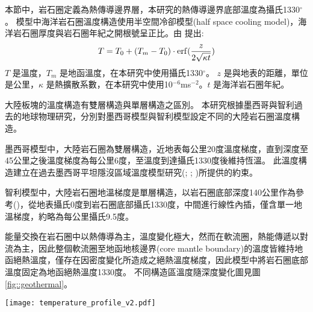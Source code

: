 

本節中，岩石圈定義為熱傳導邊界層，本研究的熱傳導邊界底部溫度為攝氏1330$^{\circ}$。
模型中海洋岩石圈溫度構造使用半空間冷卻模型(half space cooling model)，海洋岩石圈厚度與岩石圈年紀之開根號呈正比。由 \citet{davis1974}提出:
\begin{align}
T=T_0+(T_m-T_0)\cdot {\rm erf}(\frac{z}{2\sqrt{\kappa t}}) \label{eq:Half Space Model}
\end{align}
$T$ 是溫度，$T_m$ 是地函溫度，在本研究中使用攝氏1330$^{\circ}$。
$z$ 是與地表的距離，單位是公里，$\kappa$ 是熱擴散系數，在本研究中使用10$^{-6}$ms$^{-2}$。$t$ 是海洋岩石圈年紀。

大陸板塊的溫度構造有雙層構造與單層構造之區別。
本研究根據墨西哥與智利過去的地球物理研究，分別對墨西哥模型與智利模型設定不同的大陸岩石圈溫度構造。

墨西哥模型中，大陸岩石圈為雙層構造，近地表每公里20度溫度梯度，直到深度至45公里之後溫度梯度為每公里6度，至溫度到達攝氏1330度後維持恆溫。
此溫度構造建立在過去墨西哥平坦隱沒區域溫度模型研究(\citealp{Manea2005}; \citealp{Manea2011Thermal}; \citealp{Manea2011Curie})所提供的約束。

智利模型中，大陸岩石圈地溫梯度是單層構造，以岩石圈底部深度140公里作為參考(\citealp{perez2008})，從地表攝氏0度到岩石圈底部攝氏1330度，中間進行線性內插，僅含單一地溫梯度，約略為每公里攝氏9.5度。

能量交換在岩石圈中以熱傳導為主，溫度變化極大，然而在軟流圈，熱能傳遞以對流為主，因此整個軟流圈至地函地核邊界(core mantle boundary)的溫度皆維持地函絕熱溫度，僅存在因密度變化所造成之絕熱溫度梯度，因此模型中將岩石圈底部溫度固定為地函絕熱溫度1330度。
不同構造區溫度隨深度變化圖見圖\ref{fig::geothermal}。
\begin{figure*}[ht!]
    \centering
    \texttt{[image: temperature\_profile\_v2.pdf]}
    \caption[本研究使用之模型地下溫度剖面圖]{本研究使用之模型地下溫度剖面圖，左圖為智利模型，右圖為墨西哥模型。藍色實線為海洋岩石圈地溫梯度，由式\ref{eq:Half Space Model}與海洋岩石圈年紀決定。咖啡色實線為大陸岩石圈地溫梯度，智利模型大陸岩石圈為單層構造，墨西哥模型大陸岩石圈為雙層構造。圖中並沒有考量絕熱地溫梯度。}
    \label{fig::geothermal}
\end{figure*}


